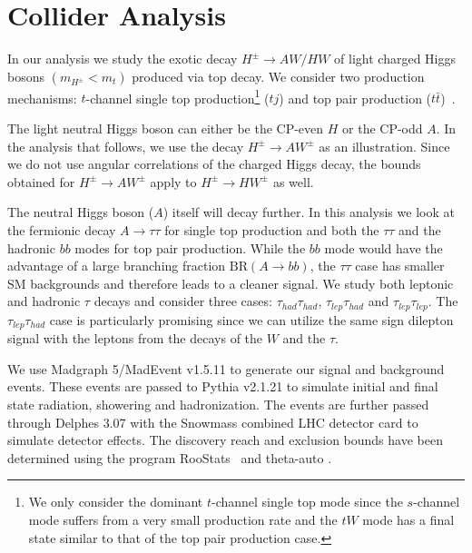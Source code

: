  



\section{Collider Analysis}
 \label{sec:light_charged_analysis}


In our analysis we study the exotic decay $H^{\pm} \rightarrow AW/HW$ of light charged Higgs bosons $(m_{H^{\pm}}<m_t)$ produced via top decay. We consider two production mechanisms: $t$-channel single top production\footnote{We only consider the dominant $t$-channel single top mode since the $s$-channel mode suffers from a very small production rate and the $tW$ mode has a final state similar to that of the top pair production case.} ($tj$) and top pair production ($t\bar{t}$)~\cite{Kidonakis:2012db}. 

 
 The light neutral Higgs boson can either be the CP-even $H$ or the CP-odd $A$. In the analysis that follows, we use the decay $H^{\pm} \rightarrow A W^{\pm}$ as an illustration. Since we do not use angular correlations of the charged Higgs decay, the bounds obtained for $H^{\pm} \rightarrow A W^{\pm}$ apply to $H^{\pm} \rightarrow H W^{\pm}$ as well.

The neutral Higgs boson ($A$) itself will decay further. In this analysis we look at the fermionic decay $A \rightarrow\tau\tau$ for single top production and both the $\tau\tau$ and the hadronic $bb$ modes for top pair production. While the $bb$ mode would have the advantage of a large branching fraction $\text{BR}(A \rightarrow bb)$, the $\tau\tau$ case has smaller SM backgrounds and therefore leads to a cleaner signal. We study both leptonic and hadronic $\tau$ decays and consider three cases: $\tau_{had}\tau_{had}$, $\tau_{lep}\tau_{had}$ and $\tau_{lep}\tau_{lep}$. The $\tau_{lep}\tau_{had}$ case is particularly promising since we can utilize the same sign dilepton signal with the leptons from the decays of the $W$ and the $\tau$. 

We use Madgraph 5/MadEvent v1.5.11 \cite{Allwall:2011uj,Alwall2014} to generate our signal and background events. These events are passed to Pythia v2.1.21 \cite{Sjostrand:2006za} to simulate initial and final state radiation, showering and hadronization. The events are further passed through Delphes 3.07 \cite{Ovyn:2009tx} with the Snowmass combined LHC detector card \cite{Anderson:2013kxz} to simulate detector effects. The discovery reach and exclusion bounds have been determined using the program RooStats~\cite{Moneta:2010pm} and theta-auto \cite{thetaauto}. 


